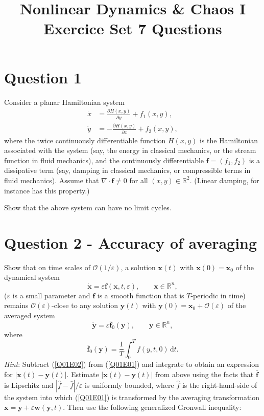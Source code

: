 \documentclass[twoside,10pt,a4paper]{article}
\title{\huge \textbf{Nonlinear Dynamics \& Chaos I \\ \Large Exercice Set 7 Questions}}	%
\author{ }		%
\date{ }	%
\begin{document}
\maketitle

\section*{Question 1}
Consider a planar Hamiltonian system
\begin{align*}
	\dot{x} &= \frac{\partial H(x,y)}{\partial y} + f_1(x,y), \\
	\dot{y} &= - \frac{\partial H(x,y)}{\partial x} + f_2(x,y),
\end{align*}
where the twice continuously differentiable function $H(x,y)$ is the Hamiltonian associated with the system (say, the energy in classical mechanics, or the stream function in fluid mechanics), and the continuously differentiable $\mathbf{f} = (f_1, f_2)$ is a dissipative term (say, damping in classical mechanics, or compressible terms in fluid mechanics). Assume that $\nabla \cdot \mathbf{f} \neq 0$ for all $(x,y) \in \mathbb{R}^2$. (Linear damping, for instance has this property.)

Show that the above system can have no limit cycles.

\section*{Question 2 - Accuracy of averaging}
Show that on time scales of $\mathcal{O}(1/\varepsilon)$, a solution $\mathbf{x}(t)$ with $\mathbf{x}(0) = \mathbf{x}_0$ of the dynamical system
\begin{equation}\label{Q01E01}
	\dot{\mathbf{x}} = \varepsilon \mathbf{f}(\mathbf{x},t, \varepsilon), \qquad \mathbf{x} \in \mathbb{R}^n,
\end{equation}
($\varepsilon$ is a small parameter and $\mathbf{f}$ is a smooth function that is $T$-periodic in time) remains $\mathcal{O}(\varepsilon)$-close to any solution $\mathbf{y}(t)$ with $\mathbf{y}(0) = \mathbf{x}_0 + \mathcal{O}(\varepsilon)$ of the averaged system
\begin{equation}\label{Q01E02}
	\dot{\mathbf{y}} = \varepsilon \bar{\mathbf{f}}_0 (\mathbf{y}), \qquad \mathbf{y} \in \mathbb{R}^n,
\end{equation}
where
\begin{equation*}
	\bar{\mathbf{f}}_0 (\mathbf{y}) = \frac{1}{T} \int_0^T f(y,t,0) \, \text{d}t.
\end{equation*}
\textit{Hint}: Subtract (\ref{Q01E02}) from (\ref{Q01E01}) and integrate to obtain an expression for $|\mathbf{x}(t) - \mathbf{y}(t)|$. Estimate $|\mathbf{x}(t) - \mathbf{y}(t)|$ from above using the facts that $\bar{\mathbf{f}}$ is Lipschitz and $|\hat{f} - \bar{f}|/\varepsilon$ is uniformly bounded, where $\hat{f}$ is the right-hand-side of the system into which (\ref{Q01E01}) is transformed by the averaging transformation $\mathbf{x} = \mathbf{y} + \varepsilon \mathbf{w}(\mathbf{y},t)$. Then use the following generalized Gronwall inequality:
\end{document}
